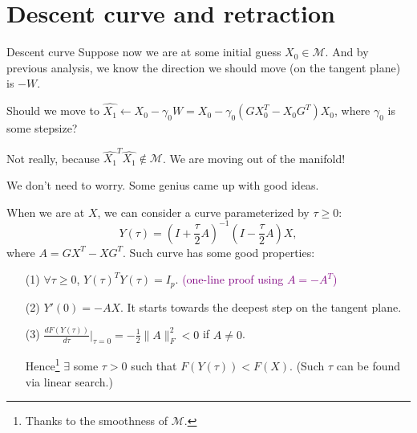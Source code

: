 \documentclass[aspectratio=43, 10pt]{beamer}
\begin{document}
\section{Descent curve and retraction}
    \begin{frame}[t]{Descent curve}
        \vspace{-0.3cm}
        Suppose now we are at some initial guess $X_0 \in \mathcal{M}$. And by previous analysis, we know the direction we should move (on the tangent plane) is $-W$. 
            
            Should we move to $\hat{X_1} \gets X_0- \gamma_0 W = X_0- \gamma_0 (GX_0^T-X_0G^T)X_0$, where $\gamma_0$ is some stepsize?

            \vspace{0.1cm}
            Not really, because $\hat{X_1}^T \hat{X_1} \notin \mathcal{M}$. We are moving out of the manifold! 

        \pause
        We don't need to worry. Some genius came up with good ideas. 

        When we are at $X$, we can consider a curve parameterized by $\tau \geq 0$: 
        $$Y(\tau) = (I+\frac{\tau}{2} A )^{-1}(I-\frac{\tau}{2} A) X,$$ 
        where $A=GX^T - XG^T$. Such curve has some good properties: 
        \small
        \begin{itemize}
            \item[(1)]  $\forall \tau \geq 0$, $Y(\tau)^T Y(\tau) = I_p$. \textcolor{purple}{(one-line proof using $A = -A^T$)}
            \item[(2)]  $Y'(0) = -AX$. It starts towards the deepest step on the tangent plane. 
            \item[(3)] $\frac{d F(Y(\tau))}{d \tau}|_{\tau=0} = -\frac{1}{2} \|A \|_F^2 < 0$ if $A \neq 0$. 
            
            Hence\footnote{Thanks to the smoothness of $\mathcal{M}$.} 
            $\exists$ some $\tau > 0$ such that $F(Y(\tau)) < F(X)$. (Such $\tau$ can be found via linear search.)
        \end{itemize}
        
    \end{frame}
\end{document}
